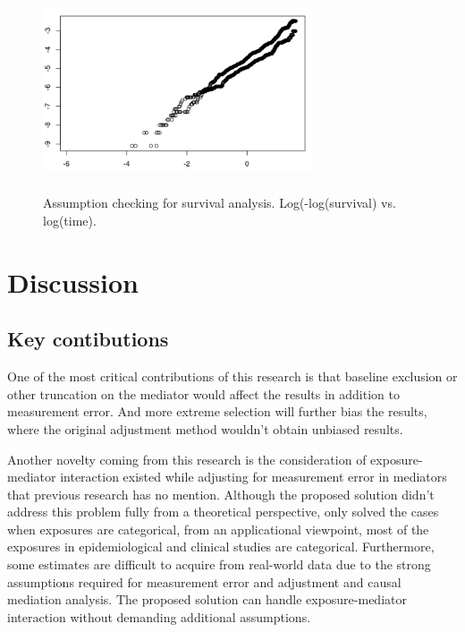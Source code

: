 \documentclass{article}
\begin{document}
\begin{figure}[h]
\centering
\includegraphics[width = 8cm,height = 6cm]{figure-12.png}
\caption{Assumption checking for survival analysis.  Log(-log(survival) vs. log(time). }
\label{fig12}
\end{figure}




\pagebreak
\clearpage


\section{Discussion}

\subsection{Key contibutions}

One of the most critical contributions of this research is that baseline exclusion or other truncation on the mediator would affect the results in addition to measurement error. And more extreme selection will further bias the results, where the original adjustment method wouldn’t obtain unbiased results. 

Another novelty coming from this research is the consideration of exposure-mediator interaction existed while adjusting for measurement error in mediators that previous research has no mention. Although the proposed solution didn’t address this problem fully from a theoretical perspective, only solved the cases when exposures are categorical, from an applicational viewpoint, most of the exposures in epidemiological and clinical studies are categorical. Furthermore, some estimates are difficult to acquire from real-world data due to the strong assumptions required for measurement error and adjustment and causal mediation analysis. The proposed solution can handle exposure-mediator interaction without demanding additional assumptions. 
\end{document}
